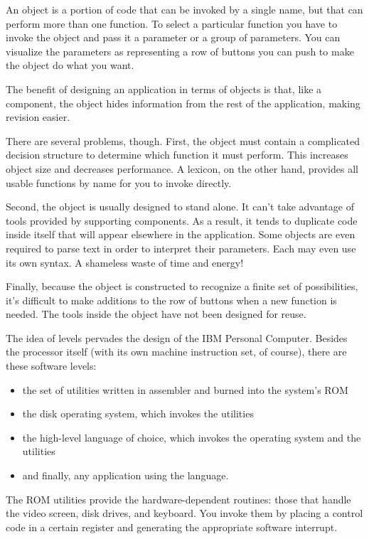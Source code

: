 An object is a portion of code that can be invoked by a single name,
but that can perform more than one function. To select a particular
function you have to invoke the object and pass it a parameter or a
group of parameters. You can visualize the parameters as representing
a row of buttons you can push to make the object do what you want.

The benefit of designing an application in terms of objects is that,
like a component, the object hides information from the rest of the
application, making revision easier.

There are several problems, though. First, the object must contain a
complicated decision structure to determine which function it must
perform. This increases object size and decreases performance. A
lexicon, on the other hand, provides all usable functions by name for
you to invoke directly.

Second, the object is usually designed to stand alone. It can't take
advantage of tools provided by supporting components. As a result, it
tends to duplicate code inside itself that will appear elsewhere in
the application. Some objects are even required to parse text in order
to interpret their parameters. Each may even use its own syntax. A
shameless waste of time and energy!


Finally, because the object is constructed to recognize a finite set
of possibilities, it's difficult to make additions to the row of
buttons when a new function is needed. The tools inside the object
have not been designed for reuse.%

The idea of levels pervades the design of the IBM Personal
Computer. Besides the processor itself (with its own machine
instruction set, of course), there are these software levels:

\begin{itemize}
\item the set of utilities written in assembler and burned into the
system's ROM
\item the disk operating system, which invokes the utilities
\item the high-level language of choice, which invokes the operating
system and the utilities
\item and finally, any application using the language.
\end{itemize}

\noindent The ROM utilities provide the hardware-dependent routines:
those that handle the video screen, disk drives, and keyboard. You
invoke them by placing a control code in a certain register and
generating the appropriate software interrupt.

